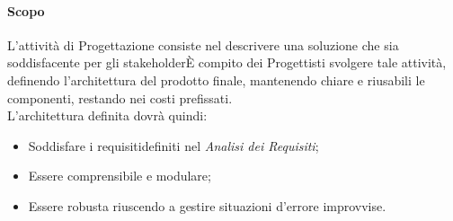 \paragraph{Scopo}\label{Progettazione_Scopo}
L'attività di Progettazione consiste nel descrivere una soluzione che sia soddisfacente per gli stakeholder\glossario È compito dei Progettisti svolgere tale attività, definendo l'architettura del prodotto finale, mantenendo chiare e riusabili le componenti, restando nei costi prefissati.\\
L'architettura definita dovrà quindi:
\begin{itemize}
	\item Soddisfare i requisiti\glossario definiti nel \textit{Analisi dei Requisiti};
	\item Essere comprensibile e modulare;
	\item Essere robusta riuscendo a gestire situazioni d'errore improvvise.
\end{itemize}

